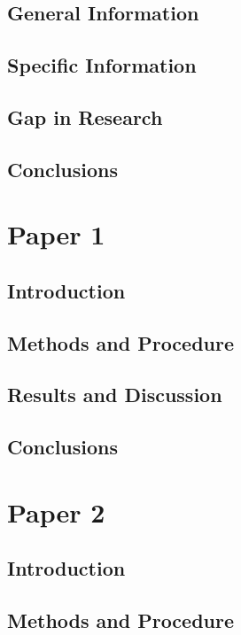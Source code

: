\documentclass[chapterbib]{ualberta}
\begin{document}
  \section{General Information}\label{sec:}
    \lipsum[23-25]
  \section{Specific Information}\label{sec:}
    \lipsum[35-37]
  \section{Gap in Research}\label{sec:}
    \lipsum[42-43]
  \section{Conclusions}\label{sec:}
    \lipsum[12-13]

\chapter{Paper 1}\label{ch:Paper1}
  \section{Introduction}\label{sec:}
    \lipsum[34-36]
  \section{Methods and Procedure}\label{sec:}
    \lipsum[46-48]
  \section{Results and Discussion}\label{sec:}
    \lipsum[55-57]
  \section{Conclusions}\label{sec:}
    \lipsum[12-13]
                
\chapter{Paper 2}\label{ch:Paper2}
  \section{Introduction}\label{sec:}
    \lipsum[34-36]
  \section{Methods and Procedure}\label{sec:}
    \lipsum[46-48]
\end{document}
